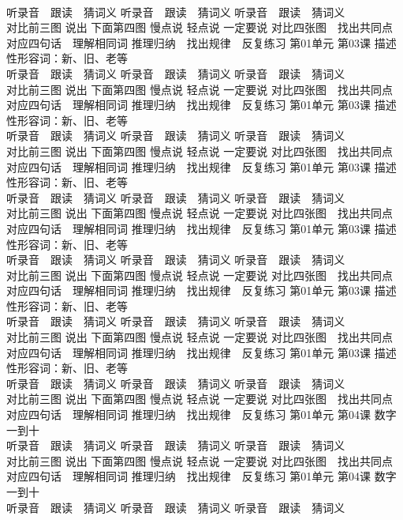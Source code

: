 \documentclass[8pt]{extreport}
\begin{document}
\begin{CJK}{UTF8}{min}
\\	听录音　跟读　猜词义 听录音　跟读　猜词义 听录音　跟读　猜词义 
\\	对比前三图 说出 下面第四图 慢点说 轻点说 一定要说	对比四张图　找出共同点 对应四句话　理解相同词 推理归纳　找出规律　反复练习 第01单元 第03课 描述性形容词：新、旧、老等
\\	听录音　跟读　猜词义 听录音　跟读　猜词义 听录音　跟读　猜词义 
\\	对比前三图 说出 下面第四图 慢点说 轻点说 一定要说	对比四张图　找出共同点 对应四句话　理解相同词 推理归纳　找出规律　反复练习 第01单元 第03课 描述性形容词：新、旧、老等
\\	听录音　跟读　猜词义 听录音　跟读　猜词义 听录音　跟读　猜词义 
\\	对比前三图 说出 下面第四图 慢点说 轻点说 一定要说	对比四张图　找出共同点 对应四句话　理解相同词 推理归纳　找出规律　反复练习 第01单元 第03课 描述性形容词：新、旧、老等
\\	听录音　跟读　猜词义 听录音　跟读　猜词义 听录音　跟读　猜词义 
\\	对比前三图 说出 下面第四图 慢点说 轻点说 一定要说	对比四张图　找出共同点 对应四句话　理解相同词 推理归纳　找出规律　反复练习 第01单元 第03课 描述性形容词：新、旧、老等
\\	听录音　跟读　猜词义 听录音　跟读　猜词义 听录音　跟读　猜词义 
\\	对比前三图 说出 下面第四图 慢点说 轻点说 一定要说	对比四张图　找出共同点 对应四句话　理解相同词 推理归纳　找出规律　反复练习 第01单元 第03课 描述性形容词：新、旧、老等
\\	听录音　跟读　猜词义 听录音　跟读　猜词义 听录音　跟读　猜词义 
\\	对比前三图 说出 下面第四图 慢点说 轻点说 一定要说	对比四张图　找出共同点 对应四句话　理解相同词 推理归纳　找出规律　反复练习 第01单元 第03课 描述性形容词：新、旧、老等
\\	听录音　跟读　猜词义 听录音　跟读　猜词义 听录音　跟读　猜词义 
\\	对比前三图 说出 下面第四图 慢点说 轻点说 一定要说	对比四张图　找出共同点 对应四句话　理解相同词 推理归纳　找出规律　反复练习 第01单元 第04课 数字一到十
\\	听录音　跟读　猜词义 听录音　跟读　猜词义 听录音　跟读　猜词义 
\\	对比前三图 说出 下面第四图 慢点说 轻点说 一定要说	对比四张图　找出共同点 对应四句话　理解相同词 推理归纳　找出规律　反复练习 第01单元 第04课 数字一到十
\\	听录音　跟读　猜词义 听录音　跟读　猜词义 听录音　跟读　猜词义 

\end{CJK}
\end{document}
